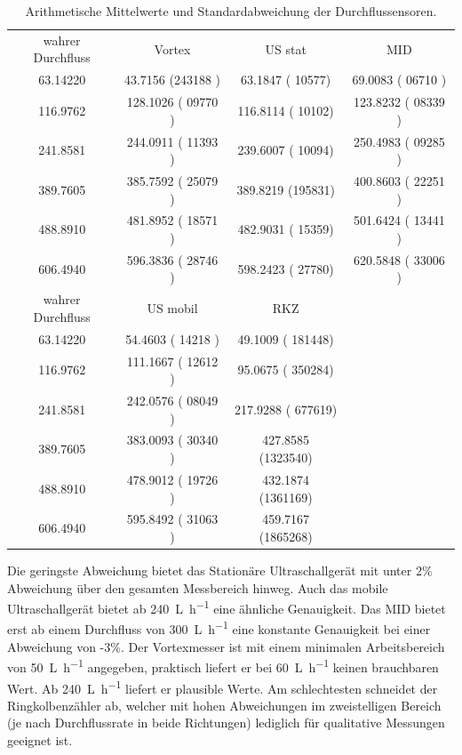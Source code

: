 \begin{table}[H]
	\centering
	\caption{Arithmetische Mittelwerte und Standardabweichung der Durchflussensoren.}
	\label{tab:meanSigData}
	\begin{tabular}{S[separate-uncertainty,table-parse-only,table-figures-uncertainty = 1]S[separate-uncertainty,table-parse-only,table-figures-uncertainty = 1]S[separate-uncertainty,table-parse-only,table-figures-uncertainty = 1]S[separate-uncertainty,table-parse-only,table-figures-uncertainty = 1]}
		
		
		
		{wahrer Durchfluss}        &  {Vortex}            &{US stat}            &{MID}            \\  
		63.14220               &  43.7156  (243188  ) & 63.1847  (  10577) &  69.0083  ( 06710 )  \\
		116.9762               &  128.1026 ( 09770  ) & 116.8114 (  10102) &  123.8232 ( 08339 )  \\
		241.8581               &  244.0911 ( 11393  ) & 239.6007 (  10094) &  250.4983 ( 09285 )  \\
		389.7605               &  385.7592 ( 25079  ) & 389.8219 (195831)  & 400.8603 ( 22251 )   \\
		488.8910               &  481.8952 ( 18571  ) & 482.9031 (  15359) &  501.6424 ( 13441 )  \\
		606.4940               &  596.3836 ( 28746  ) & 598.2423 (  27780) &  620.5848 ( 33006 )  \\
		\hline
		{wahrer Durchfluss}&		{US mobil}       &    {RKZ}           				 & \\
		63.14220						&		54.4603   ( 14218 ) &  49.1009  ( 181448) 		 & \\
		116.9762						&		111.1667  ( 12612 ) &   95.0675  ( 350284) & \\
		241.8581						&		242.0576  ( 08049 ) &  217.9288  ( 677619) & \\
		389.7605						&		383.0093  ( 30340 )  & 427.8585  (1323540) & \\
		488.8910						&		478.9012  ( 19726 ) &  432.1874  (1361169) & \\
		606.4940						&		595.8492  ( 31063 ) &  459.7167  (1865268) & \\
		
	\end{tabular}
\end{table}


Die geringste Abweichung bietet das Stationäre Ultraschallgerät mit unter 2\% Abweichung über den gesamten Messbereich hinweg. Auch das mobile Ultraschallgerät bietet ab \SI{240}{\liter\per\hour} eine ähnliche Genauigkeit. Das MID bietet erst ab einem Durchfluss von \SI{300}{\liter\per\hour} eine konstante Genauigkeit bei einer Abweichung von -3\%. Der Vortexmesser ist mit einem minimalen Arbeitsbereich von \SI{50}{\liter\per\hour} angegeben, praktisch liefert er bei \SI{60}{\liter\per\hour} keinen brauchbaren Wert. Ab \SI{240}{\liter\per\hour} liefert er plausible Werte. Am schlechtesten schneidet der Ringkolbenzähler ab, welcher mit hohen Abweichungen im zweistelligen Bereich (je nach Durchflussrate in beide Richtungen) lediglich für qualitative Messungen geeignet ist.

